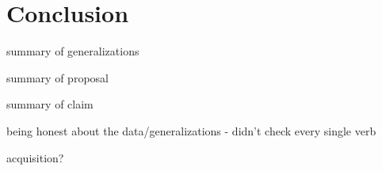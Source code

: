 \chapter{Conclusion}
\label{chap:conc}

summary of generalizations

summary of proposal

summary of claim

being honest about the data/generalizations - didn't check every single verb

acquisition?